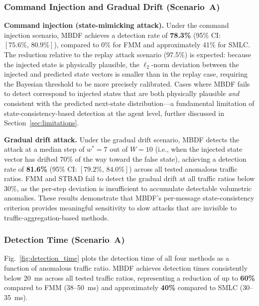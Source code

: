 \documentclass[manuscript,screen,review]{acmart}
\begin{document}
\subsubsection{Command Injection and Gradual Drift
(Scenario~A)}
\label{sec:other_attacks}

\textbf{Command injection (state-mimicking attack).}
Under the command injection scenario, MBDF achieves a
detection rate of \textbf{78.3\%} (95\% CI:
$[75.6\%,\,80.9\%]$), compared to 0\% for FMM and
approximately 41\% for SMLC. The reduction relative to
the replay attack scenario (97.5\%) is expected: because
the injected state is physically plausible, the
$\ell_2$-norm deviation between the injected and
predicted state vectors is smaller than in the replay
case, requiring the Bayesian threshold to be more
precisely calibrated. Cases where MBDF fails to detect
correspond to injected states that are both physically
plausible \emph{and} consistent with the predicted
next-state distribution---a fundamental limitation of
state-consistency-based detection at the agent level,
further discussed in Section~\ref{sec:limitations}.

\textbf{Gradual drift attack.}
Under the gradual drift scenario, MBDF detects the
attack at a median step of $w^{*} = 7$ out of $W = 10$
(i.e., when the injected state vector has drifted 70\%
of the way toward the false state), achieving a detection
rate of \textbf{81.6\%} (95\% CI: $[79.2\%,\,84.0\%]$)
across all tested anomalous traffic ratios. FMM and STBAD
fail to detect the gradual drift at all traffic ratios
below 30\%, as the per-step deviation is insufficient to
accumulate detectable volumetric anomalies. These results
demonstrate that MBDF's per-message state-consistency
criterion provides meaningful sensitivity to slow attacks
that are invisible to traffic-aggregation-based methods.

\subsubsection{Detection Time (Scenario~A)}
\label{sec:detection_time}

Fig.~\ref{fig:detection_time} plots the detection time of
all four methods as a function of anomalous traffic ratio.
MBDF achieves detection times consistently below 20~ms
across all tested traffic ratios, representing a reduction
of up to \textbf{60\%} compared to FMM (38--50~ms) and
approximately \textbf{40\%} compared to SMLC (30--35~ms).
\end{document}
